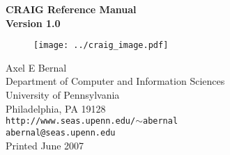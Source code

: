 \documentclass[letterpaper]{article}
\begin{document}
\begin{titlepage}
\begin{center}
{\bf \LARGE CRAIG Reference Manual\\[1ex]\Large Version 1.0}
\end{center}
\vspace*{0.5in}
\begin{figure}[!h]
\centering
\begin{minipage}{2.7in}
\texttt{[image: ../craig\_image.pdf]}
\end{minipage}
\end{figure}
\vspace*{0.5in}
\begin{center}
Axel E Bernal\\
Department of Computer and Information Sciences\\
University of Pennsylvania\\
Philadelphia, PA 19128\\
{\tt http://www.seas.upenn.edu/$\sim$abernal}\\
{\tt abernal@seas.upenn.edu}\\
\vspace*{1.5in}
Printed June 2007
\end{center}
\end{titlepage}
\tableofcontents
{}
\end{document}
